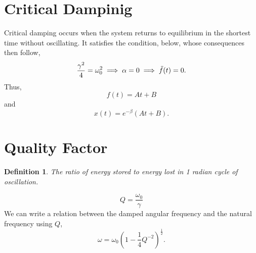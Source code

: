 \documentclass{book}
\newtheorem*{definition}{Definition}
\begin{document}
\section{Critical Dampinig}
Critical damping occurs when the system returns to equilibrium in the shortest time without oscillating. It satisfies the condition, below, whose consequences then follow,
\begin{equation}
    \frac{\gamma^2}{4}=\omega_0^2 \implies \alpha = 0 \implies \Ddot{f}(t) = 0.
\end{equation}
Thus, 
\begin{equation}
    f(t) = At + B
\end{equation}
and
\begin{equation}
    x(t) = e^{-\beta}(At+B).
\end{equation}
\section{Quality Factor}
\begin{definition}
    The ratio of energy stored to energy lost in 1 radian cycle of oscillation.
\end{definition}
\begin{equation}
    Q = \frac{\omega_0}{\gamma}
\end{equation}
We can write a relation between the damped angular frequency and the natural frequency using $Q$,
\begin{equation}
    \omega = \omega_0\left(1-\frac{1}{4}Q^{-2}\right)^{\frac{1}{2}}.
\end{equation}
\end{document}
